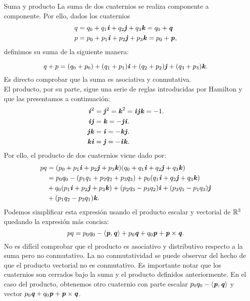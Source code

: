 		\begin{subsection}{Suma y producto}
			La suma de dos cuaternios se realiza componente a componente. Por ello, dados los cuaternios
		 	\begin{equation*}
		 	\begin{split}
		 	q &= q_0 + q_1 \textbf{\emph{i}} + q_2 \textbf{\emph{j}} + q_3 \textbf{\emph{k}} = q_0 + \textbf{\emph{q}} \\
		 	p &= p_0 + p_1 \textbf{\emph{i}} + p_2 \textbf{\emph{j}} + p_3 \textbf{\emph{k}} = p_0 + \textbf{\emph{p}},
		 	\end{split}
		 	\end{equation*}
			definimos su suma de la siguiente manera:
			
			\begin{equation*}
			q + p= (q_0 + p_0 )+ (q_1 + p_1 )\textbf{\emph{i}} + (q_2 + p_2 ) \textbf{\emph{j}} + (q_3 + p_3 ) \textbf{\emph{k}}.
			\end{equation*}
			Es directo comprobar que la suma es asociativa y conmutativa.\\
			
			El producto, por su parte, sigue una serie de reglas introducidas por Hamilton y que las presentamos a continuación:
			\begin{equation*}
			\begin{split}
			\textbf{\emph{i}}^2 &= \textbf{\emph{j}}^2 = \textbf{\emph{k}}^2 = \textbf{\emph{i}}\textbf{\emph{j}}\textbf{\emph{k}} = -1.\\
			\textbf{\emph{i}}\textbf{\emph{j}} &= 	\textbf{\emph{k}} = 	-\textbf{\emph{j}}\textbf{\emph{i}}.\\
			\textbf{\emph{j}}\textbf{\emph{k}} &= \textbf{\emph{i}} = -\textbf{\emph{k}}\textbf{\emph{j}}. \\
			\textbf{\emph{k}}\textbf{\emph{i}} &= 	\textbf{\emph{j}} = -	\textbf{\emph{i}}\textbf{\emph{k}}.
			\end{split}
			\end{equation*}
			Por ello, el producto de dos cuaternios viene dado por:
			\begin{equation*}
			\begin{split}
			pq&= (p_0 + p_1 \textbf{\emph{i}} + p_2 \textbf{\emph{j}} + p_3 \textbf{\emph{k}})(q_0 + q_1 \textbf{\emph{i}} + q_2 \textbf{\emph{j}} + q_3 \textbf{\emph{k}}) \\
			&= p_0q_0 - (p_1q_1+p_2q_2+p_3q_3) + p_0(q_1\textbf{\emph{i}}+q_2\textbf{\emph{j}}+q_3\textbf{\emph{k}}) \\
			&+ q_0(p_1\textbf{\emph{i}}+p_2\textbf{\emph{j}}+p_3\textbf{\emph{k}}) + (p_2q_3-p_3q_2)\textbf{\emph{i}} +  (p_3q_1-p_1q_3)\textbf{\emph{j}} \\
			&+ (p_1q_2-p_2q_1)\textbf{\emph{k}}.
			\end{split}
			\end{equation*}
			Podemos simplificar esta expresión usando el producto escalar y vectorial de $ \mathbb{R}^3 $ quedando la expresión más concisa:
			\[
			pq = p_0q_0 - \langle \textbf{\emph{p}} , \textbf{\emph{q}} \rangle + p_0\textbf{\emph{q}} + q_0\textbf{\emph{p}} + \textbf{\emph{p}} \times \textbf{\emph{q}}.
			\]			
			No es difícil comprobar que el producto es asociativo y distributivo respecto a la suma pero no conmutativo. La no conmutatividad se puede observar del hecho de que el producto vectorial no es conmutativo. Es importante notar que los cuaternios son cerrados bajo la suma y el producto definidos anteriormente. En el caso del producto, obtenemos otro cuaternio con parte escalar $ p_0q_0 -  \langle \textbf{\emph{p}} , \textbf{\emph{q}} \rangle $ y vector $ p_0\textbf{\emph{q}} + q_0\textbf{\emph{p}} + \textbf{\emph{p}} \times \textbf{\emph{q}} $. \\
			

\end{subsection}
